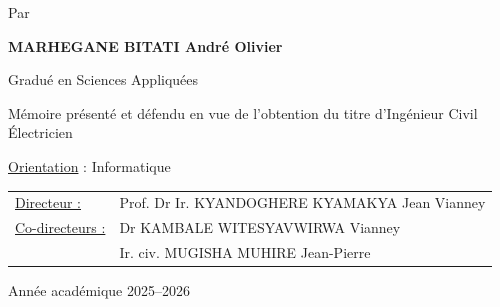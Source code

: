 \documentclass[12pt,a4paper,oneside]{report}
\begin{document}
\begin{titlepage}

\vspace{0.65cm}

{\normalsize Par\par}

\vspace{0.15cm}

{\Large\bfseries
MARHEGANE BITATI André Olivier
\par}

\vspace{0.20cm}

{\normalsize
Gradué en Sciences Appliquées
\par}

\vspace{0.55cm}


\begin{minipage}{0.72\textwidth}
\centering
\small
Mémoire présenté et défendu en vue de l'obtention du titre
d'Ingénieur Civil Électricien
\end{minipage}

\vspace{0.35cm}

{\normalsize
\underline{Orientation} : Informatique
\par}

\vspace{0.65cm}


\begin{minipage}{0.78\textwidth}
\small

\begin{tabular}{@{}p{2.8cm}p{9.2cm}@{}}
\underline{Directeur :}
&
Prof. Dr Ir. KYANDOGHERE KYAMAKYA Jean Vianney
\tabularnewline[0.25cm]

\underline{Co-directeurs :}
&
Dr KAMBALE WITESYAVWIRWA Vianney
\tabularnewline[0.15cm]

&
Ir. civ. MUGISHA MUHIRE Jean-Pierre
\tabularnewline
\end{tabular}

\end{minipage}

\vfill


{\normalsize
Année académique 2025--2026
\par}

\end{titlepage}
\end{document}
